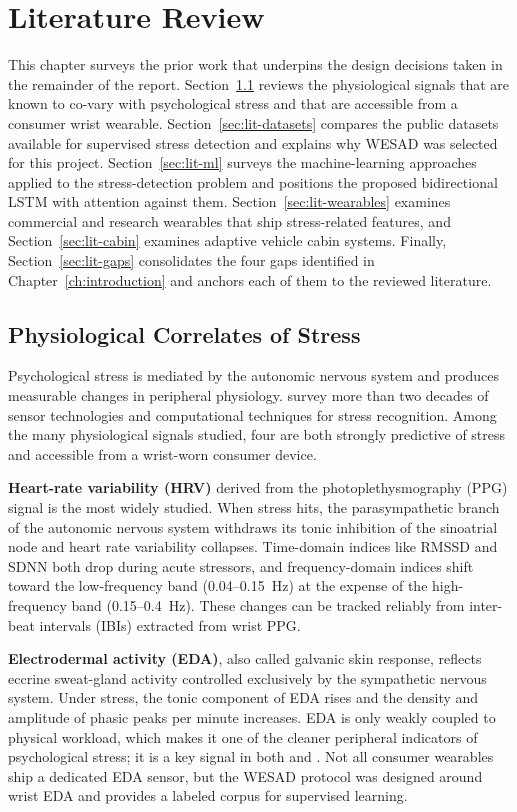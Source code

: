\chapter{Literature Review}
\label{ch:literature}

This chapter surveys the prior work that underpins the design
decisions taken in the remainder of the report. Section~\ref{sec:lit-physio}
reviews the physiological signals that are known to co-vary with
psychological stress and that are accessible from a consumer wrist
wearable. Section~\ref{sec:lit-datasets} compares the public datasets
available for supervised stress detection and explains why WESAD was
selected for this project. Section~\ref{sec:lit-ml} surveys the
machine-learning approaches applied to the stress-detection problem
and positions the proposed bidirectional LSTM with attention against
them. Section~\ref{sec:lit-wearables} examines commercial and research
wearables that ship stress-related features, and Section~\ref{sec:lit-cabin}
examines adaptive vehicle cabin systems. Finally, Section~\ref{sec:lit-gaps}
consolidates the four gaps identified in Chapter~\ref{ch:introduction}
and anchors each of them to the reviewed literature.

\section{Physiological Correlates of Stress}
\label{sec:lit-physio}

Psychological stress is mediated by the autonomic nervous system
and produces measurable changes in peripheral physiology.
\citet{sharma2012driver} survey more than two decades of sensor
technologies and computational techniques for stress recognition.
Among the many physiological signals studied, four are both strongly
predictive of stress and accessible from a wrist-worn consumer device.

\textbf{Heart-rate variability (HRV)} derived from the photoplethysmography
(PPG) signal is the most widely studied. When stress hits, the
parasympathetic branch of the autonomic nervous system withdraws its
tonic inhibition of the sinoatrial node and heart rate variability
collapses. Time-domain indices like RMSSD and SDNN both drop during
acute stressors, and frequency-domain indices shift toward the
low-frequency band (0.04--0.15~Hz) at the expense of the high-frequency
band (0.15--0.4~Hz). These changes can be tracked reliably from
inter-beat intervals (IBIs) extracted from wrist PPG.

\textbf{Electrodermal activity (EDA)}, also called galvanic skin response,
reflects eccrine sweat-gland activity controlled exclusively by the
sympathetic nervous system. Under stress, the tonic component of EDA
rises and the density and amplitude of phasic peaks per minute
increases. EDA is only weakly coupled to physical workload, which makes
it one of the cleaner peripheral indicators of psychological stress;
it is a key signal in both \citet{schmidt2018wesad} and
\citet{can2019stress}. Not all consumer wearables ship a dedicated
EDA sensor, but the WESAD protocol was designed around wrist EDA and
provides a labeled corpus for supervised learning.

